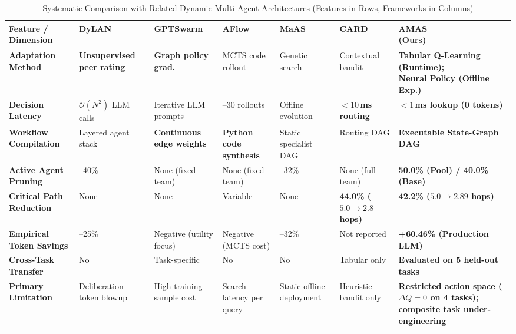 ﻿\documentclass[conference]{IEEEtran}
\makeatletter
\providecommand{\makecell}[2][c]{\begin{tabular}[#1]{@{}#1@{}}#2\end{tabular}}
\makeatother
\begin{document}
\begin{table}[!t]
\centering
\caption{Systematic Comparison with Related Dynamic Multi-Agent Architectures (Features in Rows, Frameworks in Columns)}
\label{tab:literature_comparison}
\footnotesize
\setlength{\tabcolsep}{2.5pt}
\renewcommand{\arraystretch}{1.04}
\begin{tabularx}{\textwidth}{>{\raggedright\arraybackslash\bfseries}p{2.85cm} *{5}{>{\raggedright\arraybackslash\hyphenpenalty=10000\hsize=0.86\hsize}X} >{\raggedright\arraybackslash\hyphenpenalty=10000\hsize=1.70\hsize\bfseries}X}
\toprule
\makecell[c]{\textbf{Feature /}\\\textbf{Dimension}} & 
\makecell[c]{\textbf{DyLAN}\\\cite{liu2024dylan}} & 
\makecell[c]{\textbf{GPTSwarm}\\\cite{zhuge2024gptswarm}} & 
\makecell[c]{\textbf{AFlow}\\\cite{zhang2024aflow}} & 
\makecell[c]{\textbf{MaAS}\\\cite{Zhang2025MaAS}} & 
\makecell[c]{\textbf{CARD}\\\cite{Li2025AdaptiveGraphPruning}} & 
\makecell[c]{\textbf{AMAS}\\\textbf{(Ours)}} \\
\midrule
Adaptation Method & 
\textbf{Unsupervised peer rating} & 
\textbf{Graph policy grad.} & 
MCTS code rollout & 
Genetic search & 
Contextual bandit & 
\makecell[l]{\textbf{Tabular Q-Learning (Runtime);}\\\textbf{Neural Policy (Offline Exp.)}} \\
Decision Latency & 
$\mathcal{O}(N^2)$ LLM calls & 
Iterative LLM prompts & 
15--30 rollouts & 
Offline evolution & 
\textbf{$<10$\,ms routing} & 
$<1$\,ms lookup (0 tokens) \\
Workflow Compilation & 
Layered agent stack & 
\textbf{Continuous edge weights} & 
\textbf{Python code synthesis} & 
Static specialist DAG & 
Routing DAG & 
Executable State-Graph DAG \\
Active Agent Pruning & 
25--40\% & 
None (fixed team) & 
None (fixed team) & 
18--32\% & 
None (full team) & 
50.0\% (Pool) / 40.0\% (Base) \\
Critical Path Reduction & 
None & 
None & 
Variable & 
None & 
\textbf{44.0\% ($5.0 \to 2.8$ hops)} & 
42.2\% ($5.0 \to 2.89$ hops) \\
Empirical Token Savings & 
15--25\% & 
Negative (utility focus) & 
Negative (MCTS cost) & 
18--32\% & 
Not reported & 
+60.46\% (Production LLM) \\
Cross-Task Transfer & 
No & 
Task-specific & 
No & 
No & 
Tabular only & 
Evaluated on 5 held-out tasks \\
Primary Limitation & 
Deliberation token blowup & 
High training sample cost & 
Search latency per query & 
Static offline deployment & 
Heuristic bandit only & 
Restricted action space ($\Delta Q = 0$ on 4 tasks); composite task under-engineering \\
\bottomrule
\end{tabularx}
\end{table}
\end{document}
